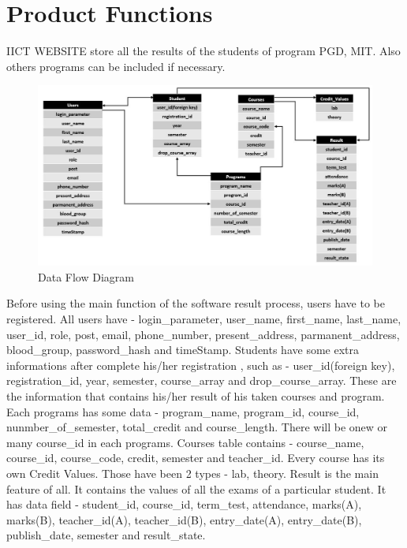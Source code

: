 \documentclass{scrreprt}
\begin{document}
\section{Product Functions}
IICT WEBSITE store all the results of the students of program PGD, MIT. Also others programs can be included if necessary.
\begin{figure}[h!]
    \centering
    \includegraphics[width=15cm]{assets/3.JPG}
    \caption{Data Flow Diagram}
    \label{fig:Data Flow Diagram}
\end{figure}
Before using the main function of the software result process, users have to be registered. 
\newline
All users have - login\_parameter, user\_name, first\_name, last\_name, user\_id, role, post, email, phone\_number, present\_address, parmanent\_address, blood\_group, password\_hash and timeStamp.
\newline
Students have some extra informations after complete his/her registration , such as - user\_id(foreign key), registration\_id, year, semester, course\_array and drop\_course\_array. These are the information that contains his/her result of his taken courses and program.
\newline
Each programs has some data - program\_name, program\_id, course\_id, nunmber\_of\_semester, total\_credit and course\_length. There will be onew or many course\_id in each programs.
\newline
Courses table contains - course\_name, course\_id, course\_code, credit, semester and teacher\_id.
\newline
Every course has its own Credit Values. Those have been 2 types - lab, theory.
\newline
Result is the main feature of all. It contains the values of all the exams of a particular student. It has data field - student\_id, course\_id, term\_test, attendance, marks(A), marks(B), teacher\_id(A), teacher\_id(B), entry\_date(A), entry\_date(B), publish\_date, semester	and result\_state.
\end{document}
